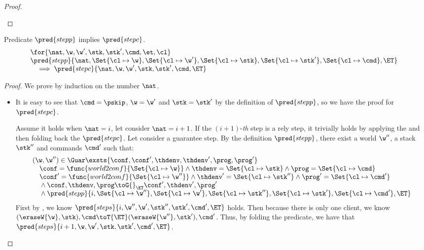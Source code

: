 \begin{proof}
\begin{itemize}
\begin{itemize}
\begin{itemize}
    \end{itemize}
\end{itemize}
\end{itemize}
\end{proof}


\begin{lemma}
\label{lem:prgram-step-to-command-step}
Predicate \( \pred{stepp} \) implies  \( \pred{stepc} \).
\[
\begin{array}{@{}l}
    \for{\nat, \w, \w', \stk, \stk', \cmd, \et, \cl} \\
    \pred{stepp}{\nat, \Set{\cl \mapsto \w},\Set{\cl \mapsto \w'}, \Set{\cl \mapsto \stk}, \Set{ \cl \mapsto \stk'}, \Set{\cl \mapsto \cmd}, \ET}  \\ 
    \quad \implies \pred{stepc}{\nat, \w, \w', \stk, \stk', \cmd, \ET} \\
\end{array}
\]
\end{lemma}
\begin{proof}
We prove by induction on the number \( \nat \).

\begin{itemize}

\item {}
It is easy to see that \( \cmd = \pskip \), \( \w = \w'\) and \( \stk = \stk' \) by the definition of \(  \pred{stepp}\), so we have the proof for \( \pred{stepc} \).

Assume it holds when \( \nat = i \), let consider \( \nat = i + 1 \).
If the \((i + 1)\)-\emph{th} step is a rely step, it trivially holds by applying the \ih and then folding back the \( \pred{stepc} \).
Let consider a guarantee step.
By the definition \( \pred{stepp}\), there exist a world \( \w'' \), a stack \( \stk'' \) and commands \( \cmd' \) such that:
\[
\begin{array}{@{}l@{}}
    (\w, \w'') \in \Guar  
    \exsts{\conf, \conf', \thdenv, \thdenv', \prog, \prog'} \\
    \quad \conf = \func{world2conf}{\Set{\cl \mapsto \w}}
    \land \thdenv =  \Set{\cl \mapsto \stk} 
    \land \prog = \Set{\cl \mapsto \cmd} \\
    \quad {} \conf' = \func{world2conf}{\Set{\cl \mapsto \w''}}
    \land \thdenv' =  \Set{\cl \mapsto \stk''} 
    \land \prog' = \Set{\cl \mapsto \cmd'} \\
    \quad {} \land  \conf, \thdenv , \prog \toG{}_{\ET} \conf', \thdenv' , \prog'   \\
    \quad {} \land \pred{stepp}{ i, \Set{\cl \mapsto \w''},\Set{\cl \mapsto \w'}, \Set{\cl \mapsto \stk''}, \Set{ \cl \mapsto \stk'}, \Set{\cl \mapsto \cmd'}, \ET}
\end{array}
\]
First by \ih, we know  \( \pred{steps}{ i, \w'', \w', \stk'', \stk', \cmd', \ET} \) holds.
Then because there is only one client, we know \( (\eraseW{\w}, \stk ), \cmd \toT{\ET} (\eraseW{\w''}, \stk'), \cmd' \).
Thus, by folding the predicate, we have that \( \pred{steps}{ i + 1, \w, \w', \stk, \stk', \cmd', \ET} \).
\end{itemize}
\end{proof}
